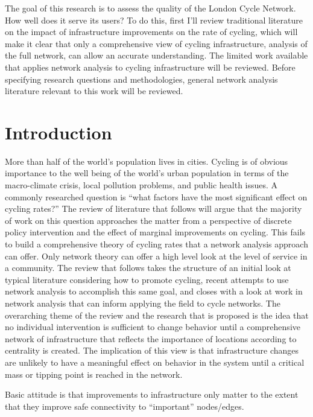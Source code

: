 \documentclass[11pt]{article} %
\begin{document}
The goal of this research is to assess the quality of the London Cycle Network. How well does it serve its users? To do this, first I'll review traditional literature on the impact of infrastructure improvements on the rate of cycling, which will make it clear that only a comprehensive view of cycling infrastructure, analysis of the full network, can allow an accurate understanding. The limited work available that applies network analysis to cycling infrastructure will be reviewed. Before specifying research questions and methodologies, general network analysis literature relevant to this work will be reviewed. 


\section{Introduction}

More than half of the world's population lives in cities. Cycling is of obvious importance to the well being of the world's  urban population in terms of the macro-climate crisis, local pollution problems, and public health issues. A commonly researched question is ``what factors have the most significant effect on cycling rates?'' The review of literature that follows will argue that the majority of work on this question approaches the matter from a perspective of discrete policy intervention and the effect of marginal improvements on cycling. This fails to build a comprehensive theory of cycling rates that a network analysis approach can offer. Only network theory can offer a high level look at the level of service in a community. The review that follows takes the structure of an initial look at typical literature considering how to promote cycling, recent attempts to use network analysis to accomplish this same goal, and closes with a look at work in network analysis that can inform applying the field to cycle networks. The overarching theme of the review and the research that is proposed is the idea that no individual intervention is sufficient to change behavior until a comprehensive network of infrastructure that reflects the importance of locations according to centrality is created. The implication of this view is that infrastructure changes are unlikely to have a meaningful effect on behavior in the system until a critical mass or tipping point is reached in the network. 

Basic attitude is that improvements to infrastructure only matter to the extent that they improve safe connectivity to ``important'' nodes/edges. 
\end{document}
